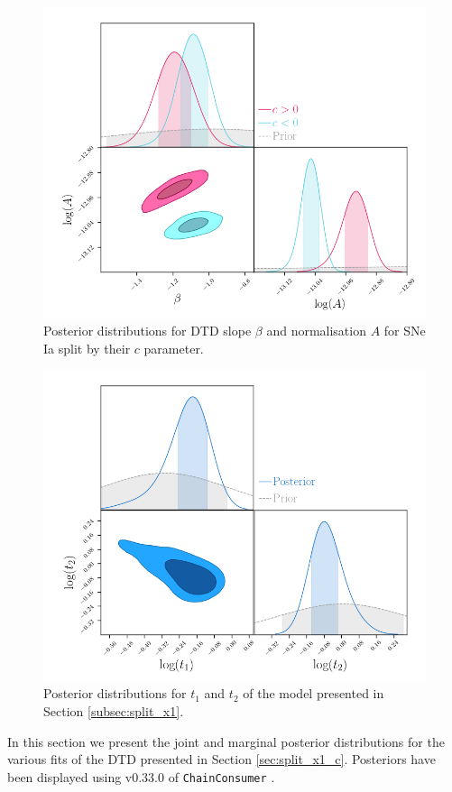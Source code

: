 \documentclass[fleqn,usenatbib]{mnras}
\begin{document}
\begin{figure}
    \centering
    \includegraphics[width=.5\textwidth]{figs/fit_dtd_split_c_A_beta_corner.png}
    \caption{Posterior distributions for DTD slope $\beta$ and normalisation $A$ for SNe Ia split by their $c$ parameter.%
    \label{fig:corner_beta_norm_split_c}}
\end{figure}
\begin{figure}
    \centering
    \includegraphics[width=.5\textwidth]{figs/fitjoint_t1_t2_corner.png}
    \caption{Posterior distributions for $t_1$ and $t_2$ of the model presented in Section \ref{subsec:split_x1}.%
    \label{fig:corner_t1_t2}}
\end{figure}
In this section we present the joint and marginal posterior distributions for the various fits of the DTD presented in Section \ref{sec:split_x1_c}. Posteriors have been displayed using v0.33.0 of \texttt{ChainConsumer} \citep{Hinton2016}.
\clearpage
\onecolumn
\end{document}
